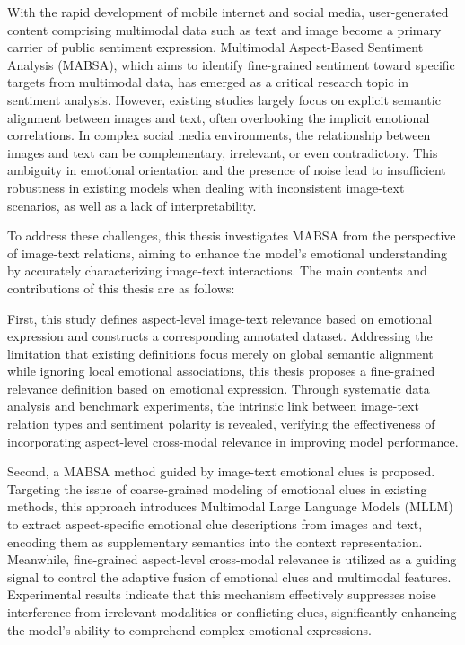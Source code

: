 
\begin{eabstract}
With the rapid development of mobile internet and social media, user-generated content comprising multimodal data such as text and image become a primary carrier of public sentiment expression. Multimodal Aspect-Based Sentiment Analysis (MABSA), which aims to identify fine-grained sentiment toward specific targets from multimodal data, has emerged as a critical research topic in sentiment analysis. However, existing studies largely focus on explicit semantic alignment between images and text, often overlooking the implicit emotional correlations. In complex social media environments, the relationship between images and text can be complementary, irrelevant, or even contradictory. This ambiguity in emotional orientation and the presence of noise lead to insufficient robustness in existing models when dealing with inconsistent image-text scenarios, as well as a lack of interpretability.

To address these challenges, this thesis investigates MABSA from the perspective of image-text relations, aiming to enhance the model's emotional understanding by accurately characterizing image-text interactions. The main contents and contributions of this thesis are as follows:

First, this study defines aspect-level image-text relevance based on emotional expression and constructs a corresponding annotated dataset. Addressing the limitation that existing definitions focus merely on global semantic alignment while ignoring local emotional associations, this thesis proposes a fine-grained relevance definition based on emotional expression. Through systematic data analysis and benchmark experiments, the intrinsic link between image-text relation types and sentiment polarity is revealed, verifying the effectiveness of incorporating aspect-level cross-modal relevance in improving model performance.

Second, a MABSA method guided by image-text emotional clues is proposed. Targeting the issue of coarse-grained modeling of emotional clues in existing methods, this approach introduces Multimodal Large Language Models (MLLM) to extract aspect-specific emotional clue descriptions from images and text, encoding them as supplementary semantics into the context representation. Meanwhile, fine-grained aspect-level cross-modal relevance is utilized as a guiding signal to control the adaptive fusion of emotional clues and multimodal features. Experimental results indicate that this mechanism effectively suppresses noise interference from irrelevant modalities or conflicting clues, significantly enhancing the model's ability to comprehend complex emotional expressions.


\end{eabstract}

